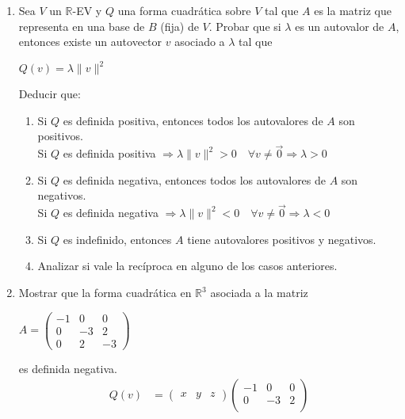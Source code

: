 \documentclass{article}
\newcommand{\R}{\mathbb{R}}
\newenvironment{tightcenter}{%
    \setlength\topsep{0pt}
    \setlength\parskip{0pt}
    \begin{center}
}{%
    \end{center}
}
\begin{document}
\begin{enumerate}
        \item Sea $V$ un $\R$-EV y $Q$ una forma cuadrática sobre $V$ tal que $A$ es la matriz que representa en una base de $B$ (fija) de $V$. Probar que si $\lambda$ es un autovalor de $A$, entonces existe un autovector $v$ asociado a $\lambda$ tal que
            \begin{tightcenter}
                $Q(v)=\lambda\|v\|^2$
            \end{tightcenter}
            Deducir que:
            \begin{enumerate}
                \item Si $Q$ es definida positiva, entonces todos los autovalores de $A$ son positivos.\\
                    Si $Q$ es definida positiva $\Rightarrow \lambda\|v\|^2>0\quad\forall v\neq\vec{0}\Rightarrow \lambda>0$
                \item Si $Q$ es definida negativa, entonces todos los autovalores de $A$ son negativos.\\
                    Si $Q$ es definida negativa $\Rightarrow \lambda\|v\|^2<0\quad\forall v\neq\vec{0}\Rightarrow \lambda<0$
                \item Si $Q$ es indefinido, entonces $A$ tiene autovalores positivos y negativos.
                \item Analizar si vale la recíproca en alguno de los casos anteriores.
            \end{enumerate}
        \item Mostrar que la forma cuadrática en $\R^3$ asociada a la matriz
            \begin{tightcenter}
                $A=
                \begin{pmatrix}
                    -1 & 0 & 0\\
                    0 & -3 & 2\\
                    0 & 2 & -3
                \end{pmatrix}$
            \end{tightcenter}
            es definida negativa.
            \begin{align*}
                Q(v)&=
                \begin{pmatrix}
                    x & y & z    
                \end{pmatrix}
                \begin{pmatrix}
                    -1 & 0 & 0\\
                    0 & -3 & 2\\

\end{pmatrix}
\end{align*}
\end{enumerate}
\end{document}
